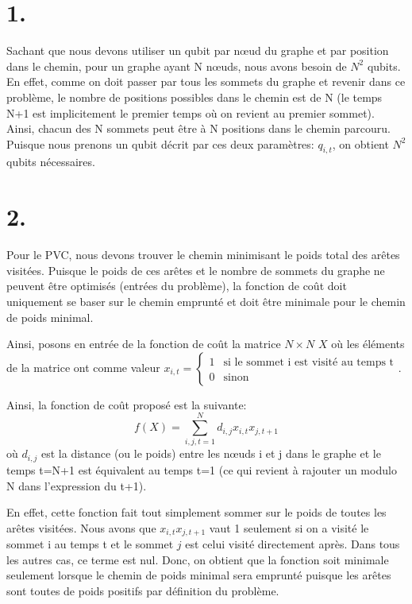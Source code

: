 \documentclass{article}
\begin{document}

\newpage

\section*{1.}
Sachant que nous devons utiliser un qubit par nœud du graphe et par position dans le chemin, pour un graphe ayant N nœuds, nous avons besoin de $N^2$ qubits. En effet, comme on doit passer par tous les sommets du graphe et revenir dans ce problème, le nombre de positions possibles dans le chemin est de N (le temps N+1 est implicitement le premier temps où on revient au premier sommet). Ainsi, chacun des N sommets peut être à N positions dans le chemin parcouru. Puisque nous prenons un qubit décrit par ces deux paramètres: $q_{i,t}$, on obtient $N^2$ qubits nécessaires.

\section*{2.}
Pour le PVC, nous devons trouver le chemin minimisant le poids total des arêtes visitées. Puisque le poids de ces arêtes et le nombre de sommets du graphe ne peuvent être optimisés (entrées du problème), la fonction de coût doit uniquement se baser sur le chemin emprunté et doit être minimale pour le chemin de poids minimal.

Ainsi, posons en entrée de la fonction de coût la matrice $N\times N$ $X$ où les éléments de la matrice ont comme valeur $x_{i,t}=\begin{cases}
      1 &\text{si le sommet i est visité au temps t} \\
      0 &\text{sinon}
    \end{cases}$.

Ainsi, la fonction de coût proposé est la suivante:
\begin{equation*}
    f(X)=\sum_{i,j,t=1}^N d_{i,j}x_{i,t}x_{j,t+1}
\end{equation*}
où $d_{i,j}$ est la distance (ou le poids) entre les nœuds i et j dans le graphe et le temps t=N+1 est équivalent au temps t=1 (ce qui revient à rajouter un modulo N dans l'expression du t+1). 

En effet, cette fonction fait tout simplement sommer sur le poids de toutes les arêtes visitées. Nous avons que $x_{i,t}x_{j,t+1}$ vaut 1 seulement si on a visité le sommet i au temps t et le sommet $j$ est celui visité directement après. Dans tous les autres cas, ce terme est nul. Donc, on obtient que la fonction soit minimale seulement lorsque le chemin de poids minimal sera emprunté puisque les arêtes sont toutes de poids positifs par définition du problème.
\end{document}
